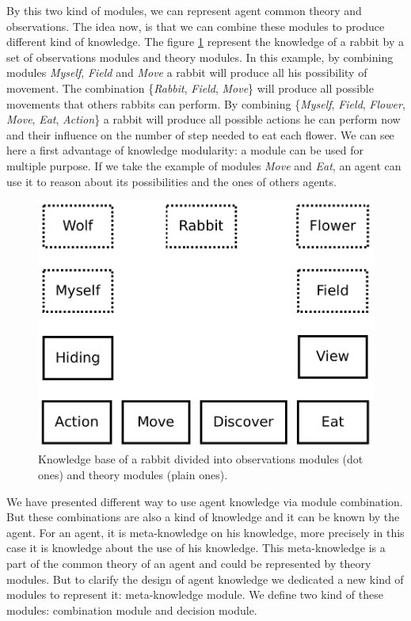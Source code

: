\documentclass{aamas2012}
\begin{document}
	By this two kind of modules, we can represent agent common theory and observations.
	The idea now, is that we can combine these modules to produce different kind of knowledge.
	The figure \ref{module_combination} represent the knowledge of a rabbit by a set of observations modules and theory modules.
	In this example, by combining modules \emph{Myself}, \emph{Field} and \emph{Move} a rabbit will produce all his possibility of movement.
	The combination \{\emph{Rabbit}, \emph{Field}, \emph{Move}\} will produce all possible movements that others rabbits can perform. 
	By combining \{\emph{Myself}, \emph{Field}, \emph{Flower}, \emph{Move}, \emph{Eat}, \emph{Action}\} 
	a rabbit will produce all possible actions he can perform now and their influence on the number of step needed to eat each flower.
	We can see here a first advantage of knowledge modularity: a module can be used for multiple purpose.
	If we take the example of modules \emph{Move} and \emph{Eat}, an agent can use it to reason about its possibilities and the ones of others agents.
	
	\begin{figure}
		\centering
		\includegraphics[keepaspectratio=true, scale=0.4]{module_combination.pdf}
		\caption
		{
			\label{module_combination}
			Knowledge base of a rabbit divided into observations modules (dot ones) and theory modules (plain ones).
		}
	\end{figure}

	We have presented different way to use agent knowledge via module combination.
	But these combinations are also a kind of knowledge and it can be known by the agent.
	For an agent, it is meta-knowledge on his knowledge, more precisely in this case it is knowledge about the use of his knowledge.
	This meta-knowledge is a part of the common theory of an agent and could be represented by theory modules.
	But to clarify the design of agent knowledge we dedicated a new kind of modules to represent it: meta-knowledge module.
	We define two kind of these modules: combination module and decision module.
	
\end{document}
